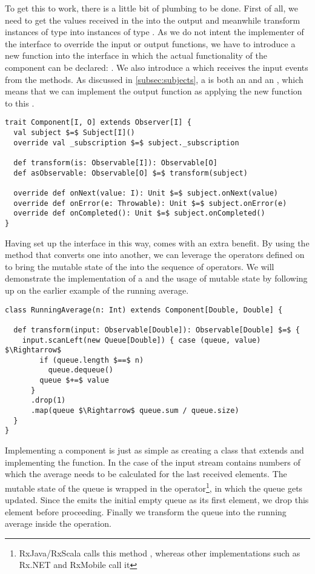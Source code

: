 To get this to work, there is a little bit of plumbing to be done. First of all, we need to get the values received in the \obv into the output \obs and meanwhile transform instances of type  into instances of type . As we do not intent the implementer of the \comp interface to override the input or output functions, we have to introduce a new function into the interface in which the actual functionality of the component can be declared: . We also introduce a \subj which receives the input events from the \obv methods. As discussed in \cref{subsec:subjects}, a \subj is both an \obv and an \obs, which means that we can implement the output function as applying the new  function to this \subj.

\begin{lstlisting}[style=InlineScalaStyle]
trait Component[I, O] extends Observer[I] {
  val subject $=$ Subject[I]()
  override val _subscription $=$ subject._subscription
  
  def transform(is: Observable[I]): Observable[O]
  def asObservable: Observable[O] $=$ transform(subject)
  
  override def onNext(value: I): Unit $=$ subject.onNext(value)
  override def onError(e: Throwable): Unit $=$ subject.onError(e)
  override def onCompleted(): Unit $=$ subject.onCompleted()
}
\end{lstlisting}

Having set up the \comp interface in this way, comes with an extra benefit. By using the  method that converts one \obs into another, we can leverage the operators defined on \obs to bring the mutable state of the \comp into the sequence of operators. We will demonstrate the implementation of a \comp and the usage of mutable state by following up on the earlier example of the running average.

\begin{lstlisting}[style=ScalaStyle]
class RunningAverage(n: Int) extends Component[Double, Double] {

  def transform(input: Observable[Double]): Observable[Double] $=$ {
    input.scanLeft(new Queue[Double]) { case (queue, value) $\Rightarrow$ 
        if (queue.length $==$ n)
          queue.dequeue()
        queue $+=$ value
      }
      .drop(1)
      .map(queue $\Rightarrow$ queue.sum / queue.size)
  }
}
\end{lstlisting}

Implementing a component is just as simple as creating a class that extends \comp and implementing the  function. In the case of  the input stream contains numbers of which the average needs to be calculated for the last  received elements. The mutable state of the queue is wrapped in the  operator\footnote{RxJava/RxScala calls this method , whereas other implementations such as Rx.NET and RxMobile call it }, in which the queue gets updated. Since the  emits the initial empty queue as its first element, we drop this element before proceeding. Finally we transform the queue into the running average inside the  operation.

